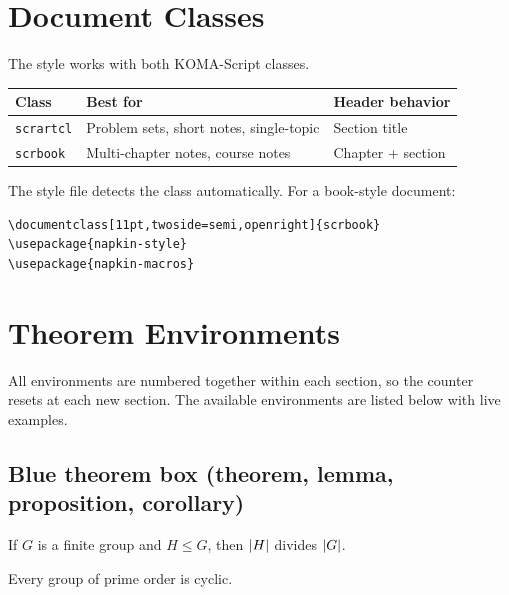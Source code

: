 \documentclass[11pt]{scrartcl}
\begin{document}
\section{Document Classes}

The style works with both KOMA-Script classes.

\begin{center}
\begin{tabular}{lll}
    \textbf{Class} & \textbf{Best for} & \textbf{Header behavior} \\
    \hline
    \texttt{scrartcl} & Problem sets, short notes, single-topic & Section title \\
    \texttt{scrbook}  & Multi-chapter notes, course notes & Chapter + section \\
\end{tabular}
\end{center}

The style file detects the class automatically. For a book-style document:
\begin{verbatim}
\documentclass[11pt,twoside=semi,openright]{scrbook}
\usepackage{napkin-style}
\usepackage{napkin-macros}
\end{verbatim}

\section{Theorem Environments}

All environments are numbered together within each section, so the counter
resets at each new section. The available environments are listed below with
live examples.

\subsection{Blue theorem box (theorem, lemma, proposition, corollary)}

\begin{theorem}[Lagrange]
    If $G$ is a finite group and $H \le G$, then $\left\lvert H \right\rvert$ divides $\left\lvert G \right\rvert$.
\end{theorem}

\begin{lemma}
    Every group of prime order is cyclic.
\end{lemma}
\end{document}
